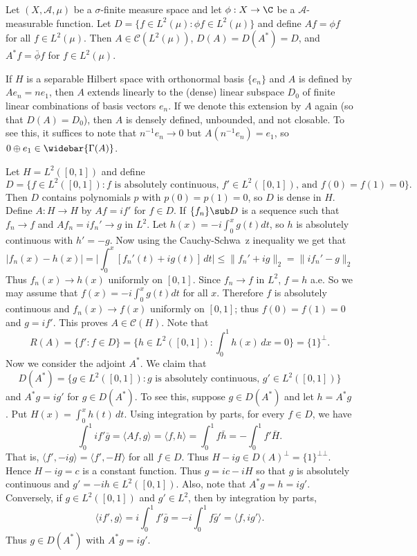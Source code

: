 \begin{example}\label{L^2 unbounded multiplication operator}
Let $(X,\mathcal{A},\mu)$ be a $\sigma$-finite measure space and let $\phi:X\to\C$ be a $\mathcal{A}$-measurable function. Let $D=\{f\in L^2(\mu):\phi f\in L^2(\mu)\}$ and define $Af=\phi f$ for all $f\in L^2(\mu)$. Then $A\in\mathcal{C}(L^2(\mu))$, $D(A)=D(A^*)=D$, and $A^*f=\bar{\phi}f$ for $f\in L^2(\mu)$.
\end{example}
\begin{example}
If $H$ is a separable Hilbert space with orthonormal basis $\{e_n\}$ and $A$ is defined by $Ae_n=ne_1$, then $A$ extends linearly to the (dense) linear subspace $D_0$ of finite linear combinations of basis vectors $e_n$. If we denote this extension by $A$ again (so that $D(A)=D_0$), then $A$ is densely defined, unbounded, and not closable. To see this, it suffices to note that $n^{-1}e_n\to 0$ but $A(n^{-1}e_n)=e_1$, so $0\oplus e_1\in\widebar{\Gamma(A)}$.
\end{example}
\begin{example}\label{L^2([0,1]) differentiation map eg-1}
Let $H=L^2([0,1])$ and define
\[D=\{f\in L^2([0,1]):\text{$f$ is absolutely
continuous, $f'\in L^2([0,1])$, and $f(0)=f(1)=0$}\}.\]
Then $D$ contains polynomials $p$ with $p(0)=p(1)=0$, so $D$ is dense in $H$. Define $A:H\to H$ by $Af=if'$ for $f\in D$. If $\{f_n\}\sub D$ is a sequence such that $f_n\to f$ and $Af_n=if_n'\to g$ in $L^2$. Let $h(x)=-i\int_0^xg(t)dt$, so $h$ is absolutely continuous with $h'=-g$. Now using the Cauchy-Schwa~z inequality we get that
\[|f_n(x)-h(x)|=\Big|\int_0^x[f_n'(t)+ig(t)]\,dt\Big|\leq\|f_n'+ig\|_2=\|if_n'-g\|_2\]
Thus $f_n(x)\to h(x)$ uniformly on $[0,1]$. Since $f_n\to f$ in $L^2$, $f=h$ a.e. So we may assume that $f(x)=-i\int_0^xg(t)dt$ for all $x$. Therefore $f$ is absolutely continuous and $f_n(x)\to f(x)$ uniformly on $[0,1]$; thus $f(0)=f(1)=0$ and $g=if'$. This proves $A\in\mathcal{C}(H)$. Note that
\[R(A)=\{f':f\in D\}=\{h\in L^2([0,1]):\int_0^1h(x)\,dx=0\}=\{1\}^\bot.\]
Now we consider the adjoint $A^*$. We claim that
\[D(A^*)=\{g\in L^2([0,1]):\text{$g$ is absolutely
continuous, $g'\in L^2([0,1])$}\}\]
and $A^*g=ig'$ for $g\in D(A^*)$. To see this, suppose $g\in D(A^*)$ and let $h=A^*g$. Put $H(x)=\int_0^xh(t)\,dt$. Using integration by parts, for every $f\in D$, we have
\[\int_0^1if'\bar{g}=\langle Af,g\rangle=\langle f,h\rangle=\int_0^1f\bar{h}=-\int_0^1f'\bar{H}.\]
That is, $\langle f',-ig\rangle=\langle f',-H\rangle$ for all $f\in D$. Thus $H-ig\in D(A)^\bot=\{1\}^{\bot\bot}$. Hence $H-ig=c$ is a constant function. Thus $g=ic-iH$ so that $g$ is absolutely continuous and $g'=-ih\in L^2([0,1])$. Also, note that $A^*g=h=ig'$. Conversely, if $g\in L^2([0,1])$ and $g'\in L^2$, then by integration by parts,
\[\langle if',g\rangle=i\int_0^1f'\bar{g}=-i\int_0^1 f\bar{g}'=\langle f,ig'\rangle.\]
Thus $g\in D(A^*)$ with $A^*g=ig'$.
\end{example}
